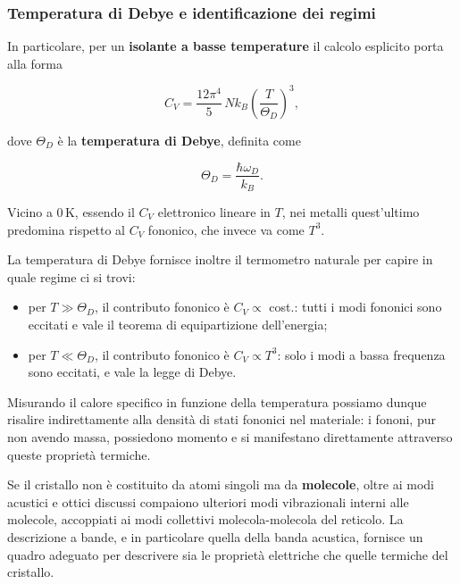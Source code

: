 \subsubsection{Temperatura di Debye e identificazione dei regimi}

In particolare, per un \textbf{isolante a basse temperature} il calcolo esplicito porta alla forma

\begin{equation}
    C_V = \frac{12 \pi^{4}}{5} \, N k_B \left( \frac{T}{\Theta_D} \right)^{3},
\end{equation}

dove \( \Theta_D \) è la \textbf{temperatura di Debye}, definita come

\begin{equation}
    \Theta_D = \frac{\hbar \omega_D}{k_B}.
\end{equation}

Vicino a \( 0 \, \text{K} \), essendo il \( C_V \) elettronico lineare in \( T \), nei metalli quest'ultimo predomina rispetto al \( C_V \) fononico, che invece va come \( T^{3} \).

La temperatura di Debye fornisce inoltre il termometro naturale per capire in quale regime ci si trovi:

\begin{itemize}
    \item per \( T \gg \Theta_D \), il contributo fononico è \( C_V \propto \) cost.: tutti i modi fononici sono eccitati e vale il teorema di equipartizione dell'energia;
    \item per \( T \ll \Theta_D \), il contributo fononico è \( C_V \propto T^{3} \): solo i modi a bassa frequenza sono eccitati, e vale la legge di Debye.
\end{itemize}

Misurando il calore specifico in funzione della temperatura possiamo dunque risalire indirettamente alla densità di stati fononici nel materiale: i fononi, pur non avendo massa, possiedono momento e si manifestano direttamente attraverso queste proprietà termiche.

Se il cristallo non è costituito da atomi singoli ma da \textbf{molecole}, oltre ai modi acustici e ottici discussi compaiono ulteriori modi vibrazionali interni alle molecole, accoppiati ai modi collettivi molecola-molecola del reticolo. La descrizione a bande, e in particolare quella della banda acustica, fornisce un quadro adeguato per descrivere sia le proprietà elettriche che quelle termiche del cristallo.

